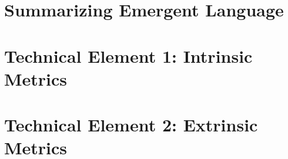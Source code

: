 % 

\section{Summarizing Emergent Language}

\section{Technical Element 1: Intrinsic Metrics}
\section{Technical Element 2: Extrinsic Metrics}
